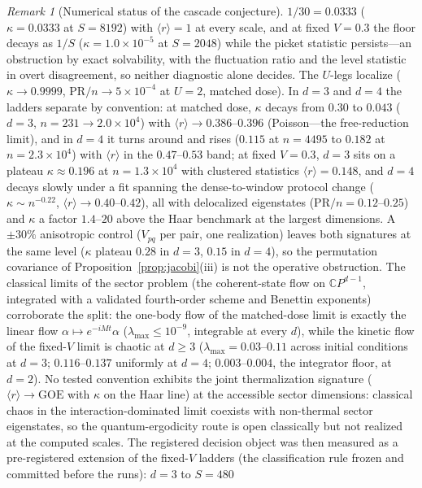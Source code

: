 \documentclass[11pt,a4paper]{article}
\theoremstyle{plain}
\theoremstyle{definition}
\theoremstyle{remark}
\newtheorem{remark}[theorem]{Remark}
\begin{document}
\begin{remark}[Numerical status of the cascade conjecture]
$1/30=0.0333$ ($\kappa=0.0333$ at $S=8192$) with $\langle r\rangle=1$ at
every scale, and at fixed $V=0.3$ the floor decays as $1/S$ ($\kappa=
1.0\times10^{-5}$ at $S=2048$) while the picket statistic persists---an
obstruction by exact solvability, with the fluctuation ratio and the level
statistic in overt disagreement, so neither diagnostic alone decides. The
$U$-legs localize ($\kappa\to0.9999$, $\mathrm{PR}/n\to5\times10^{-4}$ at
$U=2$, matched dose). In $d=3$ and $d=4$ the ladders separate by
convention: at matched dose, $\kappa$ decays from $0.30$ to $0.043$
($d=3$, $n=231\to2.0\times10^{4}$) with $\langle r\rangle\to0.386$--$0.396$
(Poisson---the free-reduction limit), and in $d=4$ it turns around and
rises ($0.115$ at $n=4495$ to $0.182$ at $n=2.3\times10^{4}$) with
$\langle r\rangle$ in the $0.47$--$0.53$ band; at fixed $V=0.3$, $d=3$
sits on a plateau $\kappa\approx0.196$ at $n=1.3\times10^{4}$ with
clustered statistics $\langle r\rangle=0.148$, and $d=4$ decays slowly
under a fit spanning the dense-to-window protocol change
($\kappa\sim n^{-0.22}$, $\langle r\rangle\to0.40$--$0.42$), all with
delocalized eigenstates ($\mathrm{PR}/n=0.12$--$0.25$) and $\kappa$ a
factor $1.4$--$20$ above the Haar benchmark at the largest dimensions. A
$\pm30\%$ anisotropic control ($V_{pq}$ per pair, one realization) leaves
both signatures at the same level ($\kappa$ plateau $0.28$ in $d=3$,
$0.15$ in $d=4$), so the permutation covariance of
Proposition~\ref{prop:jacobi}(iii) is not the operative obstruction. The
classical limits of the sector problem (the coherent-state flow on
$\mathbb{C}P^{d-1}$, integrated with a validated fourth-order scheme and
Benettin exponents) corroborate the split: the one-body flow of the
matched-dose limit is exactly the linear flow
$\alpha\mapsto e^{-iMt}\alpha$ ($\lambda_{\max}\le10^{-9}$, integrable at
every $d$), while the kinetic flow of the fixed-$V$ limit is chaotic at
$d\ge3$ ($\lambda_{\max}=0.03$--$0.11$ across initial conditions at $d=3$;
$0.116$--$0.137$ uniformly at $d=4$; $0.003$--$0.004$, the integrator
floor, at $d=2$). No tested convention exhibits the joint thermalization
signature ($\langle r\rangle\to\mathrm{GOE}$ with $\kappa$ on the Haar
line) at the accessible sector dimensions: classical chaos in the
interaction-dominated limit coexists with non-thermal sector eigenstates,
so the quantum-ergodicity route is open classically but not realized at
the computed scales. The registered decision object was then measured as
a pre-registered extension of the fixed-$V$ ladders (the classification
rule frozen and committed before the runs): $d=3$ to $S=480$

\end{remark}
\end{document}
